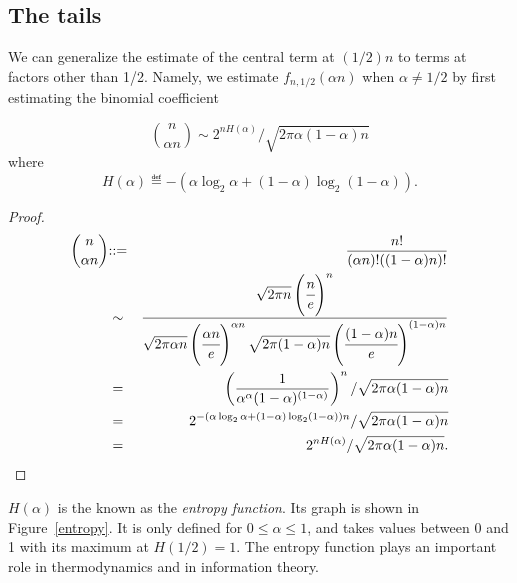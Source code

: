 \documentclass[11pt,twoside]{article}
\begin{document}
\subsection{The tails}

We can generalize the estimate of the central term at $(1/2)n$ to terms at
factors other than 1/2.  Namely, we estimate $f_{n,1/2}(\alpha n)$ when
$\alpha \neq 1/2$ by first estimating the binomial coefficient
\begin{lemma*}
\begin{equation}\label{binom-est}
\binom{n}{\alpha n} \sim 2^{nH(\alpha)}/\sqrt{2\pi \alpha(1-\alpha)n}
\end{equation}
where
\[
H(\alpha) \eqdef - (\alpha\log_2 \alpha + (1-\alpha)\log_2 (1-\alpha)).
\]
\end{lemma*}
\begin{proof}

\begin{eqnarray*}
\binom{n}{\alpha n} &\mathbin{::=}& \frac{n!}{(\alpha n)!((1-\alpha) n)!}\\ 
  &\sim& \frac{\sqrt{2\pi n}\left(\cfrac{n}{e}\right)^n}
         {\sqrt{2\pi \alpha n}\left(\cfrac{\alpha n}{e}\right)^{\alpha n}
          \sqrt{2\pi (1-\alpha) n}\left(\cfrac{(1-\alpha) n}{e}\right)^{(1-\alpha)n}}\\
&=& \left(\frac{1}{\alpha^\alpha(1-\alpha)^{(1-\alpha)}}\right)^n/\sqrt{2\pi \alpha(1-\alpha)n} \\
 &=&     2^{-(\alpha\log_2 \alpha+(1-\alpha)\log_2 (1-\alpha))n}/\sqrt{2\pi \alpha(1-\alpha)n} \\
  &=& 2^{nH(\alpha)}/\sqrt{2\pi \alpha(1-\alpha)n}.
\end{eqnarray*}
\end{proof}

$H(\alpha)$ is the known as the \emph{entropy function}.  Its graph is
shown in Figure~\ref{entropy}.  It is only defined for $0 \le \alpha \le
1$, and takes values between 0 and 1 with its maximum at $H(1/2) = 1$.
The entropy function plays an important role in thermodynamics and in
information theory.
\end{document}
